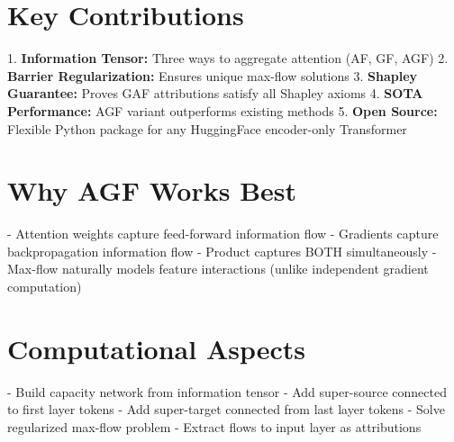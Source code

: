\section{Key Contributions}
1. \textbf{Information Tensor:} Three ways to aggregate attention (AF, GF, AGF)
2. \textbf{Barrier Regularization:} Ensures unique max-flow solutions
3. \textbf{Shapley Guarantee:} Proves GAF attributions satisfy all Shapley axioms
4. \textbf{SOTA Performance:} AGF variant outperforms existing methods
5. \textbf{Open Source:} Flexible Python package for any HuggingFace encoder-only Transformer

\section{Why AGF Works Best}
- Attention weights capture feed-forward information flow
- Gradients capture backpropagation information flow
- Product captures BOTH simultaneously
- Max-flow naturally models feature interactions (unlike independent gradient computation)

\section{Computational Aspects}
- Build capacity network from information tensor
- Add super-source connected to first layer tokens
- Add super-target connected from last layer tokens
- Solve regularized max-flow problem
- Extract flows to input layer as attributions
